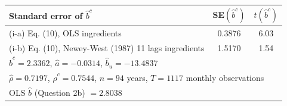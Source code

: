 \begin{tabular}{lcc}
\toprule
Standard error of $\hat b^c$ & SE$(\hat b^c)$ & $t(\hat b^c)$ \\
\midrule
(i-a) Eq. (10), OLS ingredients & 0.3876 & 6.03 \\
(i-b) Eq. (10), Newey-West (1987) 11 lags ingredients & 1.5170 & 1.54 \\
\midrule
\multicolumn{3}{l}{$\hat b^c = 2.3362$, \quad $\hat a = -0.0314$, \quad $\hat b_u = -13.4837$} \\
\multicolumn{3}{l}{$\hat\rho = 0.7197$, \quad $\hat\rho^c = 0.7544$, \quad $n = 94$ years, \quad $T = 1117$ monthly observations} \\
\multicolumn{3}{l}{OLS $\hat b$ (Question 2b) $= 2.8038$} \\
\bottomrule
\end{tabular}
